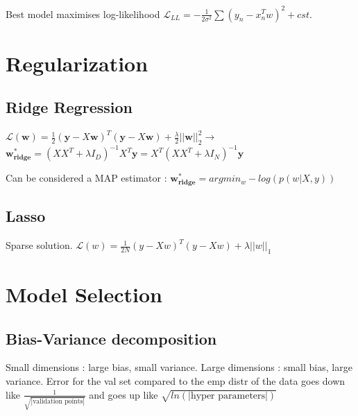 Best model maximises log-likelihood $\mathcal{L}_{LL} = -\frac{1}{2\sigma^2} \sum(y_n-x_n^Tw)^2+cst$.


\section{Regularization}
\subsection{Ridge Regression}
$\mathcal{L}(\mathbf{w}) = \frac{1}{2} (\mathbf{y} - X\mathbf{w})^T(\mathbf{y} - X\mathbf{w}) + \frac{\lambda}{2} ||\mathbf{w}||^2_2 \rightarrow$
$\mathbf{w^*_{ridge}} = (XX^T + \lambda I_D)^{-1}X^T\mathbf{y} = X^T(XX^T + \lambda I_N)^{-1}\mathbf{y}$

Can be considered a MAP estimator : $\mathbf{w^*_{ridge}} = arg min_w - log(p(w|X,y))$

\subsection{Lasso}
Sparse solution.
$\mathcal{L}(w) = \frac{1}{2N} (y - Xw)^T(y - Xw) + \lambda ||w||_1 $

\section{Model Selection}
\subsection{Bias-Variance decomposition}
Small dimensions : large bias, small variance.
Large dimensions : small bias, large variance.
Error for the val set compared to the emp distr of the data goes down like $\frac{1}{\sqrt{|\text{validation points}|}}$ and goes up like $\sqrt{ln(|\text{hyper parameters}|)}$


